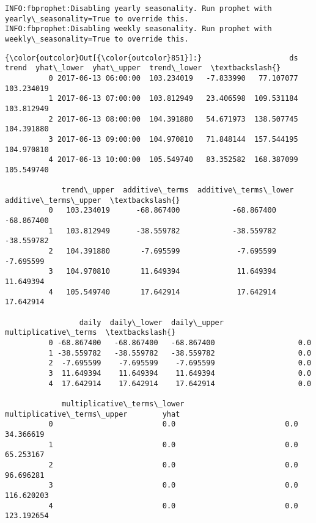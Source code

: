 \documentclass[11pt]{article}
\begin{document}
    \begin{Verbatim}[commandchars=\\\{\}]
INFO:fbprophet:Disabling yearly seasonality. Run prophet with yearly\_seasonality=True to override this.
INFO:fbprophet:Disabling weekly seasonality. Run prophet with weekly\_seasonality=True to override this.

    \end{Verbatim}

\begin{Verbatim}[commandchars=\\\{\}]
{\color{outcolor}Out[{\color{outcolor}851}]:}                    ds       trend  yhat\_lower  yhat\_upper  trend\_lower  \textbackslash{}
          0 2017-06-13 06:00:00  103.234019   -7.833990   77.107077   103.234019   
          1 2017-06-13 07:00:00  103.812949   23.406598  109.531184   103.812949   
          2 2017-06-13 08:00:00  104.391880   54.671973  138.507745   104.391880   
          3 2017-06-13 09:00:00  104.970810   71.848144  157.544195   104.970810   
          4 2017-06-13 10:00:00  105.549740   83.352582  168.387099   105.549740   
          
             trend\_upper  additive\_terms  additive\_terms\_lower  additive\_terms\_upper  \textbackslash{}
          0   103.234019      -68.867400            -68.867400            -68.867400   
          1   103.812949      -38.559782            -38.559782            -38.559782   
          2   104.391880       -7.695599             -7.695599             -7.695599   
          3   104.970810       11.649394             11.649394             11.649394   
          4   105.549740       17.642914             17.642914             17.642914   
          
                 daily  daily\_lower  daily\_upper  multiplicative\_terms  \textbackslash{}
          0 -68.867400   -68.867400   -68.867400                   0.0   
          1 -38.559782   -38.559782   -38.559782                   0.0   
          2  -7.695599    -7.695599    -7.695599                   0.0   
          3  11.649394    11.649394    11.649394                   0.0   
          4  17.642914    17.642914    17.642914                   0.0   
          
             multiplicative\_terms\_lower  multiplicative\_terms\_upper        yhat  
          0                         0.0                         0.0   34.366619  
          1                         0.0                         0.0   65.253167  
          2                         0.0                         0.0   96.696281  
          3                         0.0                         0.0  116.620203  
          4                         0.0                         0.0  123.192654  
\end{Verbatim}
            
\end{document}
